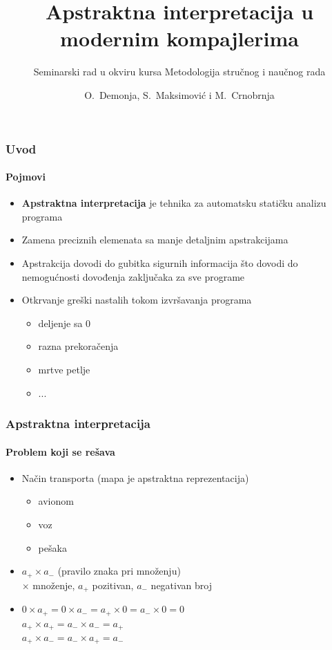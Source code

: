 \documentclass[xetex,mathserif,serif]{beamer}
\title [Apstraktna interpretacija]%
{Apstraktna interpretacija u modernim kompajlerima}
\subtitle{Seminarski rad u okviru kursa Metodologija stručnog i naučnog rada}
\author[\quad Demonja, Maksimović, Crnobrnja \quad] %
{O.~Demonja, S.~Maksimović i M.~Crnobrnja}
\institute%
{
  Matematički fakultet\\
  Univerzitet u beogradu
}
\date %
\begin{document}
  \frame{\titlepage}
  
  \begin{frame}
    \frametitle{Uvod}
	    \framesubtitle{Pojmovi}
		\begin{center}
		\begin{itemize}
			\item \textbf{Apstraktna interpretacija} je tehnika za automatsku statičku analizu programa
			\item Zamena preciznih elemenata sa manje detaljnim apstrakcijama
			\item Apstrakcija dovodi do gubitka sigurnih informacija što dovodi do nemogućnosti dovođenja zaključaka za sve programe
			\item Otkrvanje greški nastalih tokom izvršavanja programa 
				\begin{itemize}
					\item deljenje sa 0
					\item razna prekoračenja
					\item mrtve petlje
					\item ...
				\end{itemize}
		\end{itemize}
	\end{center}
  \end{frame}  
  
  \begin{frame}
    \frametitle{Apstraktna interpretacija}
	    \framesubtitle{Problem koji se rešava}
		\begin{center}
			\begin{itemize}
			\item {Način transporta} \only<2-4> {(mapa je apstraktna reprezentacija)}
			\begin{itemize}
				\item avionom
				\item voz
				\item pešaka
			\end{itemize}

			\pause			
			\pause			
			
	        \item $a_{+} \times a_{-}$ \only<4> {(pravilo znaka pri množenju)}\\
    	    {\color{cyan} $\times$ množenje, $a_{+}$ pozitivan, $a_{-}$ negativan broj}
    	\end{itemize}

   		 \begin{itemize}
     		\item $0 \times a_{+} = 0 \times a_{-} = a_{+} \times 0 = a_{-} \times 0 = 0$ \\
     		$a_{+} \times a_{+} = a_{-} \times a_{-} = a_{+}$ \\
     		$a_{+} \times a_{-} = a_{-} \times a_{+} = a_{-}$
    	\end{itemize}
	\end{center}
  \end{frame}    
  
\end{document}
